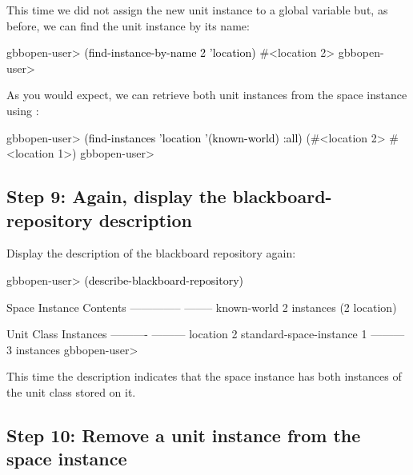 \documentclass[10pt,twoside,english,pdftex]{article}
\begin{document}
%
This time we did not assign the new  unit
instance to a global variable but, as before, we can find the unit instance by
its name:
%
\W\supp
\begin{example}
\textcolor{darkergray}{%
  gbbopen-user> \textcolor{black}{(find-instance-by-name 2 'location)}
  #<location 2>
  gbbopen-user>}
\end{example}

%
%
As you would expect, we can retrieve both  unit
instances from the  space instance using
:
%
\W\supp
\begin{example}
\textcolor{darkergray}{%
  gbbopen-user> \textcolor{black}{(find-instances 'location '(known-world) :all)}
  (#<location 2> #<location 1>)
  gbbopen-user>}
\end{example}

\subsection*{Step 9: Again, display the blackboard-repository description}

%
Display the description of the blackboard repository again:
%
\W\supp
\begin{example}
\textcolor{darkergray}{%
  gbbopen-user> \textcolor{black}{(describe-blackboard-repository)}
  
  Space Instance                Contents
  --------------                --------
  known-world                   2 instances (2 location)

  Unit Class                    Instances
  ----------                    ---------
  location                              2
  standard-space-instance               1
                                ---------
                                        3 instances
  gbbopen-user>}
\end{example}

This time the description indicates that the  space
instance has both instances of the  unit class stored on
it.

\subsection*{Step 10:  Remove a unit instance from the space instance}
\end{document}
